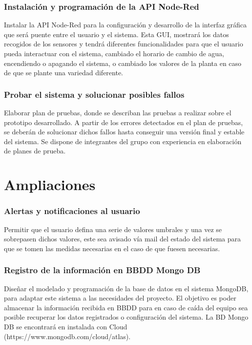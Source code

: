 \documentclass[12pt,a4paper,titlepage,oneside]{report}
\begin{document}
	
	\subsection*{Instalación y programación de la API Node-Red}
	Instalar la API Node-Red para la configuración y desarrollo de la interfaz gráfica que será puente entre el usuario y el sistema. Esta GUI, mostrará los datos recogidos de los sensores y tendrá diferentes funcionalidades para que el usuario pueda interactuar con el sistema, cambiado el horario de cambio de agua, encendiendo o apagando el sistema, o cambiado los valores de la planta en caso de que se plante una variedad diferente.
	
	\subsection*{Probar el sistema y solucionar posibles fallos}
	Elaborar plan de pruebas, donde se describan las pruebas a realizar sobre el prototipo desarrollado. A partir de los errores detectados en el plan de pruebas, se deberán de solucionar dichos fallos hasta conseguir una versión final y estable del sistema.
Se dispone de integrantes del grupo con experiencia en elaboración de planes de prueba.
	

\chapter{Ampliaciones}

\subsection*{Alertas y notificaciones al usuario}
	Permitir que el usuario defina una serie de valores umbrales y una vez se sobrepasen dichos valores, este sea avisado vía mail del estado del sistema para que se tomen las medidas necesarias en el caso de que fuesen necesarias.

	\subsection*{Registro de la información en BBDD Mongo DB}
	Diseñar el modelado y programación de la base de datos en el sistema MongoDB, para adaptar este sistema a las necesidades del proyecto. El objetivo es poder almacenar la información recibida en BBDD para en caso de caída del equipo sea posible recuperar los datos registrados o configuración del sistema. La BD Mongo DB se encontrará en instalada con Cloud (https://www.mongodb.com/cloud/atlas).
\end{document}
